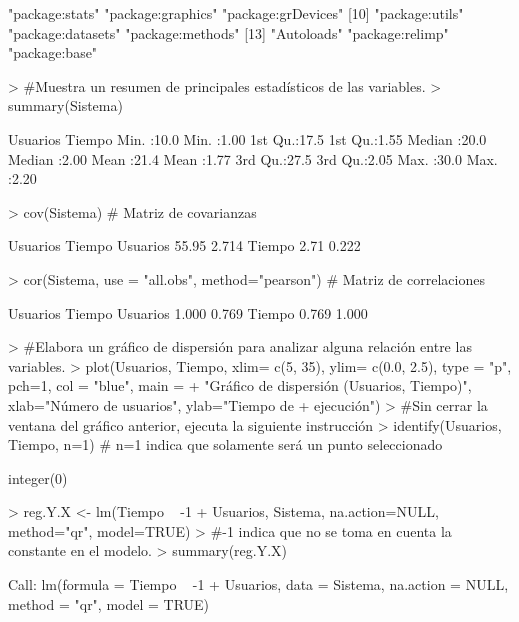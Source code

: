 \documentclass{article}
\begin{document}
\begin{Schunk}
\begin{Soutput}
 [7] "package:stats"     "package:graphics"  "package:grDevices"
[10] "package:utils"     "package:datasets"  "package:methods"  
[13] "Autoloads"         "package:relimp"    "package:base"     
\end{Soutput}
\begin{Sinput}
> #Muestra un resumen de principales estadísticos de las variables.
> summary(Sistema)
\end{Sinput}
\begin{Soutput}
    Usuarios        Tiempo    
 Min.   :10.0   Min.   :1.00  
 1st Qu.:17.5   1st Qu.:1.55  
 Median :20.0   Median :2.00  
 Mean   :21.4   Mean   :1.77  
 3rd Qu.:27.5   3rd Qu.:2.05  
 Max.   :30.0   Max.   :2.20  
\end{Soutput}
\begin{Sinput}
> cov(Sistema) # Matriz de covarianzas
\end{Sinput}
\begin{Soutput}
         Usuarios Tiempo
Usuarios    55.95  2.714
Tiempo       2.71  0.222
\end{Soutput}
\begin{Sinput}
> cor(Sistema, use = "all.obs", method="pearson") # Matriz de correlaciones
\end{Sinput}
\begin{Soutput}
         Usuarios Tiempo
Usuarios    1.000  0.769
Tiempo      0.769  1.000
\end{Soutput}
\begin{Sinput}
> #Elabora un gráfico de dispersión para analizar alguna relación entre las variables.
> plot(Usuarios, Tiempo, xlim= c(5, 35), ylim= c(0.0, 2.5), type = "p", pch=1, col = "blue", main =
+ "Gráfico de dispersión (Usuarios, Tiempo)", xlab="Número de usuarios", ylab="Tiempo de
+ ejecución")
> #Sin cerrar la ventana del gráfico anterior, ejecuta la siguiente instrucción
> identify(Usuarios, Tiempo, n=1) # n=1 indica que solamente será un punto seleccionado
\end{Sinput}
\begin{Soutput}
integer(0)
\end{Soutput}
\begin{Sinput}
> reg.Y.X <- lm(Tiempo ~ -1 + Usuarios, Sistema, na.action=NULL, method="qr", model=TRUE)
> #-1 indica que no se toma en cuenta la constante en el modelo.
> summary(reg.Y.X)
\end{Sinput}
\begin{Soutput}
Call:
lm(formula = Tiempo ~ -1 + Usuarios, data = Sistema, na.action = NULL, 
    method = "qr", model = TRUE)


\end{Soutput}
\end{Schunk}
\end{document}
